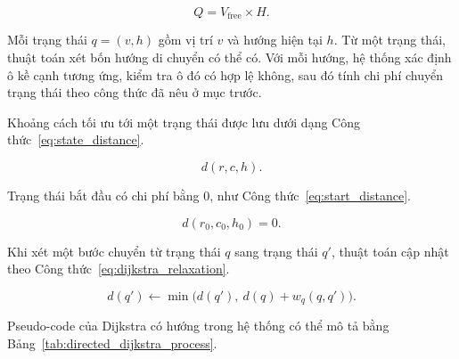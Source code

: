 \documentclass[../DoAn.tex]{subfiles}
\begin{document}
\begin{equation}
    Q = V_{\text{free}} \times H.
    \label{eq:directed_state_space}
\end{equation}

Mỗi trạng thái $q=(v,h)$ gồm vị trí $v$ và hướng hiện tại $h$. Từ một trạng thái, thuật toán xét bốn hướng di chuyển có thể có. Với mỗi hướng, hệ thống xác định ô kề cạnh tương ứng, kiểm tra ô đó có hợp lệ không, sau đó tính chi phí chuyển trạng thái theo công thức đã nêu ở mục trước.

Khoảng cách tối ưu tới một trạng thái được lưu dưới dạng Công thức~\ref{eq:state_distance}.

\begin{equation}
    d(r,c,h).
    \label{eq:state_distance}
\end{equation}

Trạng thái bắt đầu có chi phí bằng 0, như Công thức~\ref{eq:start_distance}.

\begin{equation}
    d(r_0,c_0,h_0)=0.
    \label{eq:start_distance}
\end{equation}

Khi xét một bước chuyển từ trạng thái $q$ sang trạng thái $q'$, thuật toán cập nhật theo Công thức~\ref{eq:dijkstra_relaxation}.

\begin{equation}
    d(q') \leftarrow \min\bigl(d(q'),\ d(q)+w_q(q,q')\bigr).
    \label{eq:dijkstra_relaxation}
\end{equation}

Pseudo-code của Dijkstra có hướng trong hệ thống có thể mô tả bằng Bảng~\ref{tab:directed_dijkstra_process}.
\end{document}
